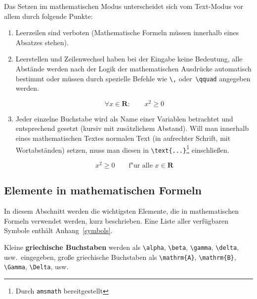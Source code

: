 Das Setzen im mathematischen Modus unterscheidet sich vom
Text-Modus vor allem durch folgende Punkte:
\begin{enumerate}
\item Leerzeilen sind verboten (Mathematische Formeln müssen
  innerhalb eines Absatzes stehen).

\item Leerstellen und Zeilenwechsel haben bei der Eingabe keine
  Bedeutung, alle Abstände werden nach der Logik der
  mathematischen Ausdrücke automatisch bestimmt oder müssen
  durch spezielle Befehle wie \lstinline|\,| oder~\lstinline|\qquad|
  angegeben werden.

\begin{LTXexample}
\begin{equation}
\forall x \in \mathbf{R}:
\qquad x^{2} \geq 0
\end{equation}
\end{LTXexample}


\item Jeder einzelne Buchstabe wird als Name einer Variablen
  betrachtet und entsprechend gesetzt (kursiv mit
  zusätzlichem Abstand).  Will man innerhalb eines
  mathematischen Textes normalen Text (in aufrechter Schrift, mit
  Wortabständen) setzen, muss man diesen in
  \lstinline|\text{...}|\footnote{Durch \texttt{amsmath} bereitgestellt} einschließen.

\begin{LTXexample}
\begin{equation}
x^{2} \geq 0\qquad
\text{f"ur alle }
x \in \mathbf{R}
\end{equation}
\end{LTXexample}



\end{enumerate}

\subsection{Elemente in mathematischen Formeln}

In diesem Abschnitt werden die wichtigsten Elemente, die in
mathematischen Formeln verwendet werden, kurz beschrieben.  Eine
Liste aller verfügbaren Symbole enthält
Anhang~\vref{symbols}.

\bigskip

Kleine \textbf{griechische Buchstaben} werden als \lstinline|\alpha|,
\lstinline|\beta|, \lstinline|\gamma|, \lstinline|\delta|, usw.\ eingegeben,
große griechische Buchstaben als \lstinline|\mathrm{A}|,
\lstinline|\mathrm{B}|, \lstinline|\Gamma|, \lstinline|\Delta|, usw.

